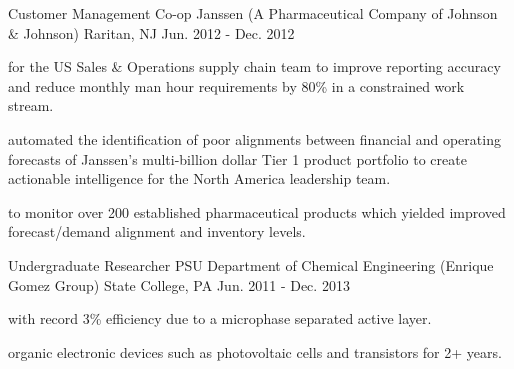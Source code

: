 \begin{cventries}
  \cventry
    {Customer Management Co-op} %
    {Janssen (A Pharmaceutical Company of Johnson \& Johnson)} %
    {Raritan, NJ} %
    {Jun. 2012 - Dec. 2012} %
    {
      \begin{cvitems} %
        \item { for the US Sales \& Operations supply chain team to improve reporting accuracy and reduce monthly man hour requirements by 80\% in a constrained work stream.}
        \item { automated the identification of poor alignments between financial and operating forecasts of Janssen's multi-billion dollar Tier 1 product portfolio to create actionable intelligence for the North America leadership team.}
        \item { to monitor over 200 established pharmaceutical products which yielded improved forecast/demand alignment and inventory levels.}
      \end{cvitems}
    }

  \cventry
    {Undergraduate Researcher} %
    {PSU Department of Chemical Engineering (Enrique Gomez Group)} %
    {State College, PA} %
    {Jun. 2011 - Dec. 2013} %
    {
      \begin{cvitems} %
        \item { with record 3\% efficiency due to a microphase separated active layer.}
	    \item { organic electronic devices such as photovoltaic cells and transistors for 2+ years.}        
      \end{cvitems}
    }


\end{cventries}
